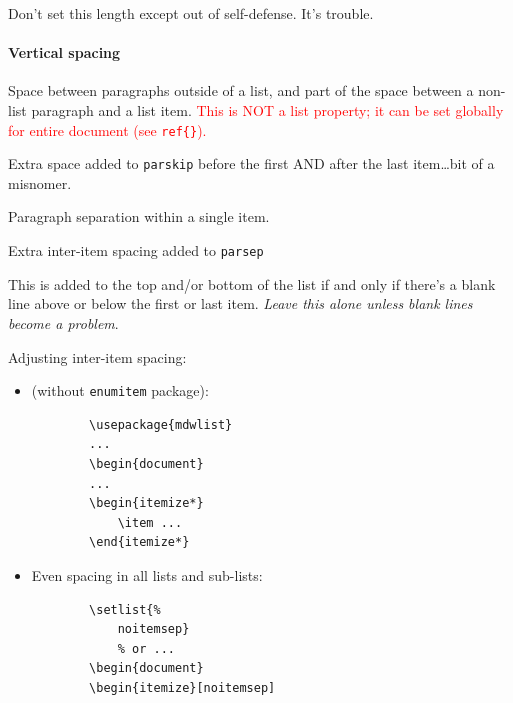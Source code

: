 \documentclass{article}
\begin{document}
\begin{description}[labelindent=2cm, leftmargin=\labelindent,
        ]
        Don't set this length except out of self-defense. It's trouble.
\end{description}
\paragraph{Vertical spacing}
\begin{description}[labelindent=2cm, leftmargin=\labelindent]
    \item [parskip] Space between paragraphs outside of a list, and part of
        the space between a non-list paragraph and a list item.
        \textcolor{red}{This is NOT a list property; it can be set
        globally for entire document (see \SS{} \texttt{ref\{\}}).}
    \item [topsep] Extra space added to \texttt{parskip} before the first
        AND after the last item\ldots bit of a misnomer.
    \item [parsep] Paragraph separation within a single item.
    \item [itemsep] Extra inter-item spacing added to \texttt{parsep}
    \item [partopsep] This is added to the top and/or bottom of the list
        if and only if there's a blank line above or below the first
        or last item. \emph{Leave this alone unless blank lines become a
        problem}.
\end{description}
Adjusting inter-item spacing:
\begin{itemize}
    \item (without \texttt{enumitem} package):
        \begin{lstlisting}
        \usepackage{mdwlist}
        ...
        \begin{document}
        ...
        \begin{itemize*}
            \item ...
        \end{itemize*}
        \end{lstlisting}
    \item Even spacing in all lists and sub-lists:
        \begin{lstlisting}
        \setlist{%
            noitemsep}
            % or ...
        \begin{document}
        \begin{itemize}[noitemsep]
        \end{lstlisting}
\end{itemize}
\end{document}
